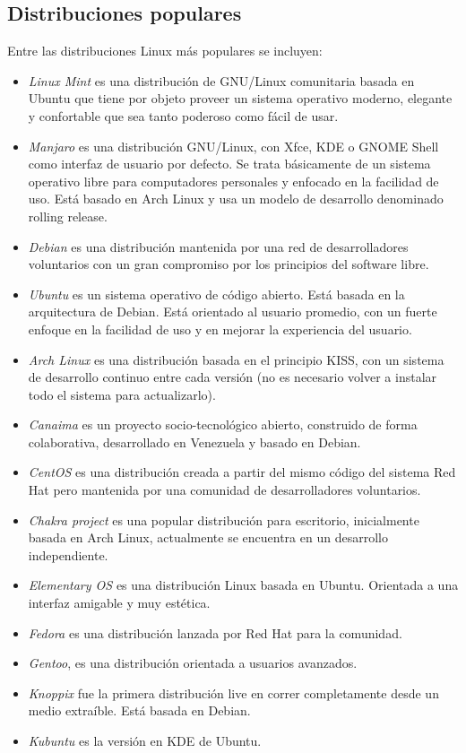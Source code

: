 \subsection{Distribuciones populares}

Entre las distribuciones Linux más populares se incluyen:

\begin{itemize}
	\item \textit{Linux Mint} es una distribución de GNU/Linux comunitaria basada en Ubuntu que tiene por objeto proveer un sistema operativo moderno, elegante y confortable que sea tanto poderoso como fácil de usar.
	\item \textit{Manjaro} es una distribución GNU/Linux, con Xfce, KDE o GNOME Shell como interfaz de usuario por defecto. Se trata básicamente de un sistema operativo libre para computadores personales y enfocado en la facilidad de uso. Está basado en Arch Linux y usa un modelo de desarrollo denominado rolling release.
	\item \textit{Debian} es una distribución mantenida por una red de desarrolladores voluntarios con un gran compromiso por los principios del software libre.
	\item \textit{Ubuntu} es un sistema operativo de código abierto. Está basada en la arquitectura de Debian. 
	Está orientado al usuario promedio, con un fuerte enfoque en la facilidad de uso y en mejorar la experiencia del usuario.
	\item \textit{Arch Linux} es una distribución basada en el principio KISS, con un sistema de desarrollo continuo entre cada versión (no es necesario volver a instalar todo el sistema para actualizarlo).
	\item \textit{Canaima} es un proyecto socio-tecnológico abierto, construido de forma colaborativa, desarrollado en Venezuela y basado en Debian.
	\item \textit{CentOS} es una distribución creada a partir del mismo código del sistema Red Hat pero mantenida por una comunidad de desarrolladores voluntarios.
	\item \textit{Chakra project} es una popular distribución para escritorio, inicialmente basada en Arch Linux, actualmente se encuentra en un desarrollo independiente.
	\item \textit{Elementary OS} es una distribución Linux basada en Ubuntu. Orientada a una interfaz amigable y muy estética.
	\item \textit{Fedora} es una distribución lanzada por Red Hat para la comunidad.
	\item \textit{Gentoo}, es una distribución orientada a usuarios avanzados.
	\item \textit{Knoppix} fue la primera distribución live en correr completamente desde un medio extraíble. Está basada en Debian.
	\item \textit{Kubuntu} es la versión en KDE de Ubuntu.
\end{itemize}

